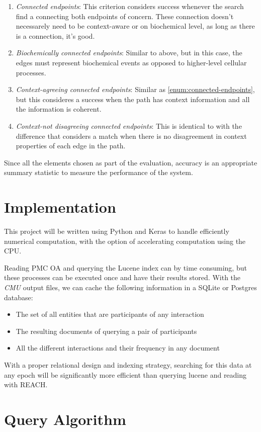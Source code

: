 \documentclass[12pt]{article}
\begin{document}
\begin{enumerate}
  \item \label{enum:connected-endpoints} \emph{Connected endpoints}: This criterion considers success whenever the search find a connecting both endpoints of concern. These connection doesn't necessarely need to be context-aware or on biochemical level, as long as there is a connection, it's good.
  \item \emph{Biochemically connected endpoints}: Similar to above, but in this case, the edges must represent biochemical events as opposed to higher-level cellular processes.
  \item \label{enum:context-agreeing}\emph{Context-agreeing connected endpoints}: Similar as \ref{enum:connected-endpoints}, but this consideres a success when  the path has context information and all the information is coherent.
	\item \emph{Context-not disagreeing connected endpoints}: This is identical to \label{enum:context-agreeing}with the difference that considers a match when there is no disagreement in context properties of each edge in the path.
\end{enumerate}

Since all the elements chosen as part of the evaluation, accuracy is an appropriate summary statistic to measure the performance of the system.


\section{Implementation}

This project will be written using Python and Keras to handle efficiently numerical computation, with the option of accelerating computation using the CPU.

Reading PMC OA and querying the Lucene index can by time consuming, but these processes can be executed once and have their results stored. With the \emph{CMU} output files, we can cache the following information in a SQLite or Postgres database:

\begin{itemize}
  \item The set of all entities that are participants of any interaction
  \item The resulting documents of querying a pair of participants
  \item All the different interactions and their frequency in any document
\end{itemize}

With a proper relational design and indexing strategy, searching for this data at any epoch will be significantly more efficient than querying lucene and reading with REACH. 

\pagebreak
\appendix
\section{Query Algorithm}
\label{apx:query}
\end{document}
